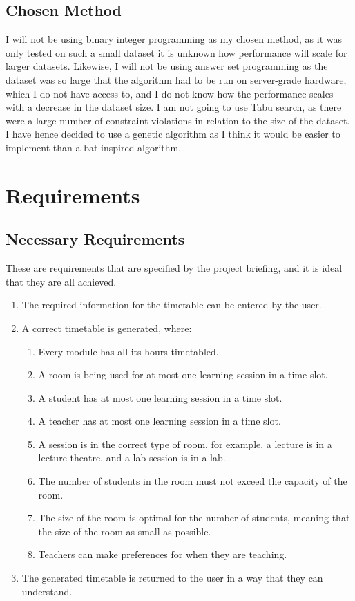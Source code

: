 \documentclass[a4paper, 12pt]{report}
\begin{document}
\section{Chosen Method}

I will not be using binary integer programming as my chosen method, as it was 
only tested on such a small dataset it is unknown how performance will scale for
larger datasets.
Likewise, I will not be using answer set programming as the dataset was so large
that the algorithm had to be run on server-grade hardware, which I do not have 
access to, and I do not know how the performance scales with a decrease in the 
dataset size.
I am not going to use Tabu search, as there were a large number of constraint 
violations in relation to the size of the dataset.
I have hence decided to use a genetic algorithm as I think it would be easier to
implement than a bat inspired algorithm.

\chapter{Requirements}  %

\section{Necessary Requirements}

These are requirements that are specified by the project briefing, and it is
ideal that they are all achieved.
\begin{enumerate}
	\item The required information for the timetable can be entered by the user.
	\item A correct timetable is generated, where:
	\begin{enumerate}
		\item Every module has all its hours timetabled.
		\item A room is being used for at most one learning session in a time 
			slot.
		\item A student has at most one learning session in a time slot.
		\item A teacher has at most one learning session in a time slot.
		\item A session is in the correct type of room, for example, a lecture
			is in a lecture theatre, and a lab session is in a lab.
		\item The number of students in the room must not exceed the capacity of
			the room.
		\item The size of the room is optimal for the number of students,
			meaning that the size of the room as small as possible.
		\item Teachers can make preferences for when they are teaching.
	\end{enumerate}
	\item The generated timetable is returned to the user in a way that they can
		understand.
\end{enumerate}
\end{document}
